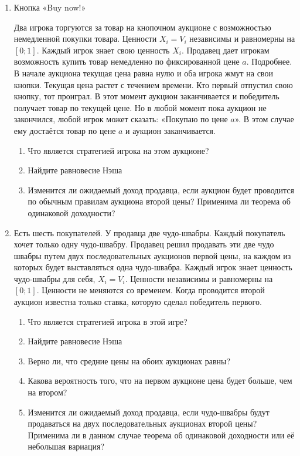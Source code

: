 \begin{enumerate}
\item Кнопка «Buy now!»

Два игрока торгуются за товар на кнопочном аукционе с возможностью немедленной покупки товара. Ценности $ X_{i}=V_{i} $ независимы и равномерны на $ [0;1] $. Каждый игрок знает свою ценность $ X_{i} $. Продавец дает игрокам возможность купить товар немедленно по фиксированной цене $ a $. Подробнее. В начале аукциона текущая цена равна нулю и оба игрока жмут на свои кнопки. Текущая цена растет с течением времени. Кто первый отпустил свою кнопку, тот проиграл. В этот момент аукцион заканчивается и победитель получает товар по текущей цене. Но в любой момент пока аукцион не закончился, любой игрок может сказать: «Покупаю по цене $ a $». В этом случае ему достаётся товар по цене $ a $ и аукцион заканчивается.
\begin{enumerate}
\item Что является стратегией игрока на этом аукционе?
\item Найдите равновесие Нэша
\item Изменится ли ожидаемый доход продавца, если аукцион будет проводится по обычным правилам аукциона второй цены? Применима ли теорема об одинаковой доходности?
\end{enumerate}

\item Есть шесть покупателей. У продавца две чудо-швабры. Каждый покупатель хочет только одну чудо-швабру. Продавец решил продавать эти две чудо швабры путем двух последовательных аукционов первой цены, на каждом из которых будет выставляться одна чудо-швабра. Каждый игрок знает ценность чудо-швабры для себя, $ X_{i}=V_{i} $. Ценности независимы и равномерны на $ [0;1] $. Ценности не меняются со временем. Когда проводится второй аукцион известна только ставка, которую сделал победитель первого.

\begin{enumerate}
\item Что является стратегией игрока в этой игре?
\item Найдите равновесие Нэша
\item Верно ли, что средние цены на обоих аукционах равны?
\item Какова вероятность того, что на первом аукционе цена будет больше, чем на втором?
\item Изменится ли ожидаемый доход продавца, если чудо-швабры будут продаваться на двух последовательных аукционах второй цены? Применима ли в данном случае теорема об одинаковой доходности или её небольшая вариация?
\end{enumerate}


\end{enumerate}
